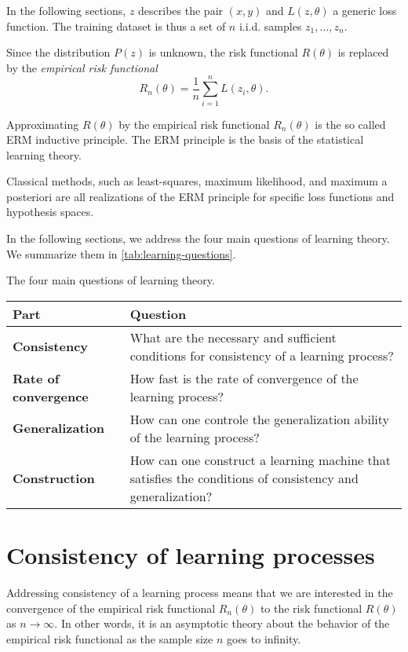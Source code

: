 In the following sections, $z$ describes the pair $(x, y)$ and $L(z, \theta)$ a generic loss
function.  The training dataset is thus a set of $n$ i.i.d. samples $z_1, \dots, z_n$.

Since the distribution $P(z)$ is unknown, the risk functional $R(\theta)$ is replaced by
the \emph{empirical risk functional}
\begin{equation}
  \label{eq:empirical-risk}
  R_n(\theta) = \frac{1}{n} \sum_{i=1}^n L(z_i, \theta)\text{.}
\end{equation}

Approximating $R(\theta)$ by the empirical risk functional $R_n(\theta)$ is the so called
ERM inductive principle.  The ERM principle is the basis of the statistical learning
theory.

Classical methods, such as least-squares, maximum likelihood, and maximum a posteriori are
all realizations of the ERM principle for specific loss functions and hypothesis spaces.

In the following sections, we address the four main questions of learning theory.  We
summarize them in \cref{tab:learning-questions}.

\begin{tablebox}[label=tab:learning-questions]{The four main questions of learning theory.}
  \begin{tabularx}{\textwidth}{@{}lX@{}}
    \toprule
    Part & Question \\
    \midrule
    \textbf{Consistency} &
      What are the necessary and sufficient conditions for consistency of a learning process? \\
    \textbf{Rate of convergence} &
      How fast is the rate of convergence of the learning process? \\
    \textbf{Generalization} &
      How can one controle the generalization ability of the learning process? \\
    \textbf{Construction} &
      How can one construct a learning machine that satisfies the conditions of consistency and generalization? \\
    \bottomrule
  \end{tabularx}
\end{tablebox}

\section{Consistency of learning processes}

Addressing consistency of a learning process means that we are interested in the
convergence of the empirical risk functional $R_n(\theta)$ to the risk functional
$R(\theta)$ as $n \to \infty$.  In other words, it is an asymptotic theory about the
behavior of the empirical risk functional as the sample size $n$ goes to infinity.

